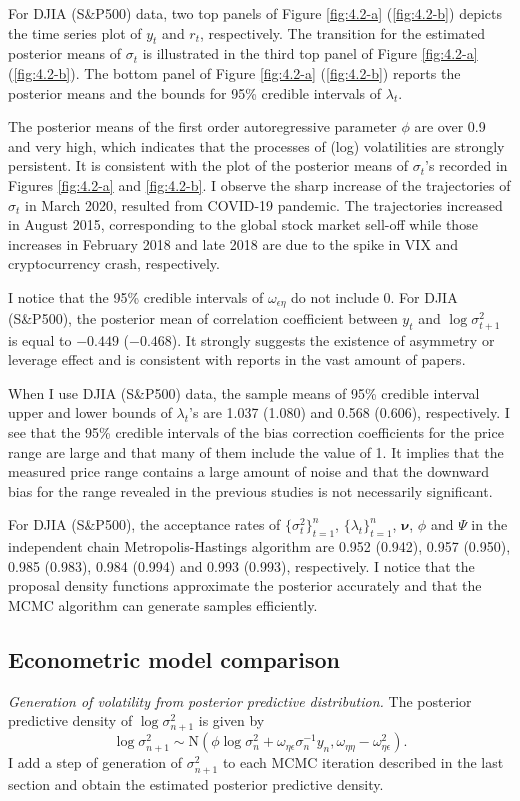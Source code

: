 \documentclass[11pt]{article}
\begin{document}
For DJIA (S\&P500) data, two top panels of Figure \ref{fig:4.2-a} (\ref{fig:4.2-b}) depicts the time series plot of $y_t$ and $r_t$, respectively. 
The transition for the estimated posterior means of $\sigma_t$ is illustrated in the third top panel of Figure \ref{fig:4.2-a} (\ref{fig:4.2-b}). 
The bottom panel of Figure \ref{fig:4.2-a} (\ref{fig:4.2-b}) reports the posterior means and the bounds for 95\% credible intervals of $\lambda_t$. 

The posterior means of the first order autoregressive parameter $\phi$ are over 0.9 and very high, which indicates that the processes of (log) volatilities are strongly persistent. 
It is consistent with the plot of the posterior means of $\sigma_t$'s recorded in Figures \ref{fig:4.2-a} and \ref{fig:4.2-b}. 
I observe the sharp increase of the trajectories of $\sigma_t$ in March 2020, resulted from COVID-19 pandemic. 
The trajectories increased in August 2015, corresponding to the global stock market sell-off while those increases in February 2018 and late 2018 are due to the spike in VIX and cryptocurrency crash, respectively. 

I notice that the 95\% credible intervals of $\omega_{\epsilon\eta}$ do not include $0$. 
For DJIA (S\&P500), the posterior mean of correlation coefficient between $y_t$ and $\log\sigma^2_{t+1}$ is equal to $-0.449$ ($-0.468$). 
It strongly suggests the existence of asymmetry or leverage effect and is consistent with reports in the vast amount of papers. 

When I use DJIA (S\&P500) data, the sample means of 95\% credible interval upper and lower bounds of $\lambda_t$'s are 1.037 (1.080) and 0.568 (0.606), respectively. 
I see that the 95\% credible intervals of the bias correction coefficients for the price range are large and that many of them include the value of 1. 
It implies that the measured price range contains a large amount of noise and that the downward bias for the range revealed in the previous studies is not necessarily significant. 

For DJIA (S\&P500), the acceptance rates of $\{\sigma^2_t\}_{t=1}^n$, $\{\lambda_t\}_{t=1}^{n}$, $\bm{\nu}$, $\phi$ and $\Psi$ in the independent chain Metropolis-Hastings algorithm are 0.952 (0.942), 0.957 (0.950), 0.985 (0.983), 0.984 (0.994) and 0.993 (0.993), respectively. 
I notice that the proposal density functions approximate the posterior accurately and that the MCMC algorithm can generate samples efficiently. 


\subsection{Econometric model comparison}
\noindent
{\it Generation of volatility from posterior predictive distribution.} 
The posterior predictive density of $\log\sigma^2_{n+1}$ is given by
\begin{equation}
\log\sigma^2_{n+1} \sim\mathrm{N}(\phi\log\sigma^2_n +\omega_{\eta\epsilon}\sigma_{n}^{-1}y_n, \omega_{\eta\eta}-\omega_{\eta\epsilon}^2).
\end{equation}
I add a step of generation of $\sigma^2_{n+1}$ to each MCMC iteration described in the last section and obtain the estimated posterior predictive density. 
\end{document}
